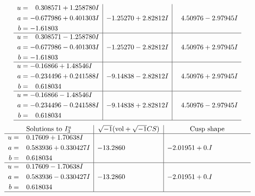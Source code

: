 \documentclass[1p]{elsarticle_modified}
\theoremstyle{definition}
\newcommand{\I}{\sqrt{-1}}
\begin{document}
$$\begin{array}{c|c|c}
\begin{aligned}
u &= \phantom{-}0.308571 + 1.258780 I \\
a &= -0.677986 + 0.401303 I \\
b &= -1.61803\phantom{ +0.000000I}\end{aligned}
 & -1.25270 + 2.82812 I & \phantom{-}4.50976 - 2.97945 I \\ \hline\begin{aligned}
u &= \phantom{-}0.308571 - 1.258780 I \\
a &= -0.677986 - 0.401303 I \\
b &= -1.61803\phantom{ +0.000000I}\end{aligned}
 & -1.25270 - 2.82812 I & \phantom{-}4.50976 + 2.97945 I \\ \hline\begin{aligned}
u &= -0.16866 + 1.48546 I \\
a &= -0.234496 + 0.241588 I \\
b &= \phantom{-}0.618034\phantom{ +0.000000I}\end{aligned}
 & -9.14838 - 2.82812 I & \phantom{-}4.50976 + 2.97945 I \\ \hline\begin{aligned}
u &= -0.16866 - 1.48546 I \\
a &= -0.234496 - 0.241588 I \\
b &= \phantom{-}0.618034\phantom{ +0.000000I}\end{aligned}
 & -9.14838 + 2.82812 I & \phantom{-}4.50976 - 2.97945 I\\
 \hline 
 \end{array}$$\newpage$$\begin{array}{c|c|c}  
\text{Solutions to }I^u_{3}& \I (\text{vol} + \sqrt{-1}CS) & \text{Cusp shape}\\
 \hline 
\begin{aligned}
u &= \phantom{-}0.17609 + 1.70638 I \\
a &= \phantom{-}0.583936 + 0.330427 I \\
b &= \phantom{-}0.618034\phantom{ +0.000000I}\end{aligned}
 & -13.2860\phantom{ +0.000000I} & -2.01951 + 0. I\phantom{ +0.000000I} \\ \hline\begin{aligned}
u &= \phantom{-}0.17609 - 1.70638 I \\
a &= \phantom{-}0.583936 - 0.330427 I \\
b &= \phantom{-}0.618034\phantom{ +0.000000I}\end{aligned}
 & -13.2860\phantom{ +0.000000I} & -2.01951 + 0. I\phantom{ +0.000000I}\\
 \hline 
 \end{array}$$\newpage\newpage\renewcommand{\arraystretch}{1}
\end{document}
